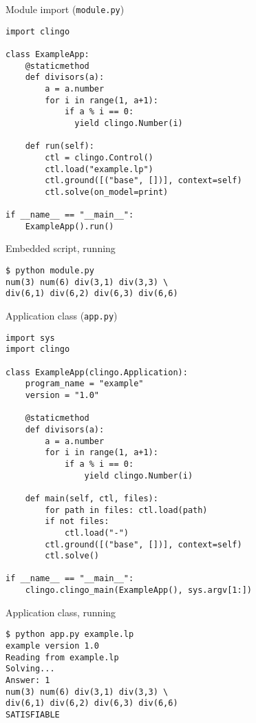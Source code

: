 \begin{frame}{Module import (\texttt{module.py})}
\begin{lstlisting}
import clingo

class ExampleApp:
    @staticmethod
    def divisors(a):
        a = a.number
        for i in range(1, a+1):
            if a % i == 0:
              yield clingo.Number(i)

    def run(self):
        ctl = clingo.Control()
        ctl.load("example.lp")
        ctl.ground([("base", [])], context=self)
        ctl.solve(on_model=print)

if __name__ == "__main__":
    ExampleApp().run()
\end{lstlisting}
\end{frame}
\begin{frame}[fragile]{Embedded script, running}
  \bigskip
\begin{lstlisting}
$ python module.py
num(3) num(6) div(3,1) div(3,3) \
div(6,1) div(6,2) div(6,3) div(6,6)
\end{lstlisting}
\end{frame}
\begin{frame}[fragile,shrink]{Application class (\texttt{app.py})}
\begin{lstlisting}
import sys
import clingo

class ExampleApp(clingo.Application):
    program_name = "example"
    version = "1.0"

    @staticmethod
    def divisors(a):
        a = a.number
        for i in range(1, a+1):
            if a % i == 0:
                yield clingo.Number(i)

    def main(self, ctl, files):
        for path in files: ctl.load(path)
        if not files:
            ctl.load("-")
        ctl.ground([("base", [])], context=self)
        ctl.solve()

if __name__ == "__main__":
    clingo.clingo_main(ExampleApp(), sys.argv[1:])
\end{lstlisting}
\end{frame}
\begin{frame}[fragile]{Application class, running}
  \bigskip
\begin{lstlisting}
$ python app.py example.lp
example version 1.0
Reading from example.lp
Solving...
Answer: 1
num(3) num(6) div(3,1) div(3,3) \
div(6,1) div(6,2) div(6,3) div(6,6)
SATISFIABLE
\end{lstlisting}
\end{frame}
